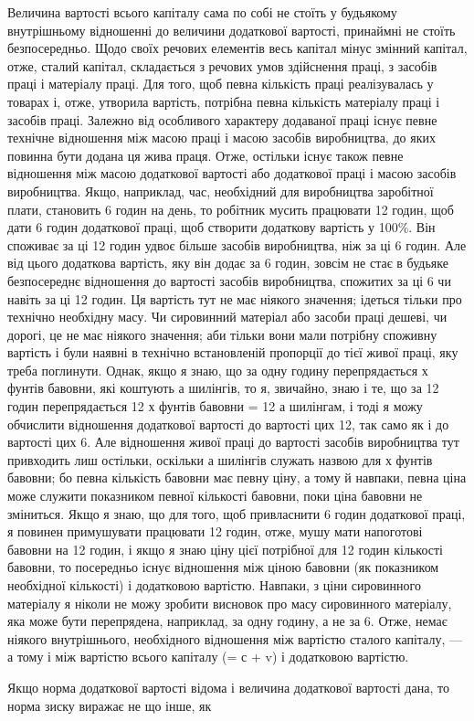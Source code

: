 Величина вартості всього капіталу сама по собі не стоїть
у будьякому внутрішньому відношенні до величини додаткової
вартості, принаймні не стоїть безпосередньо. Щодо своїх речових
елементів весь капітал мінус змінний капітал, отже, сталий капітал,
складається з речових умов здійснення праці, з засобів праці
і матеріалу праці. Для того, щоб певна кількість праці реалізувалась
у товарах і, отже, утворила вартість, потрібна певна
кількість матеріалу праці і засобів праці. Залежно від особливого
характеру додаваної праці існує певне технічне відношення
між масою праці і масою засобів виробництва, до яких повинна
бути додана ця жива праця. Отже, остільки існує також певне
відношення між масою додаткової вартості або додаткової праці
і масою засобів виробництва. Якщо, наприклад, час, необхідний
для виробництва заробітної плати, становить 6 годин на день,
то робітник мусить працювати 12 годин, щоб дати 6 годин додаткової
праці, щоб створити додаткову вартість у 100\%. Він
споживає за ці 12 годин удвоє більше засобів виробництва, ніж
за ці 6 годин. Але від цього додаткова вартість, яку він додає
за 6 годин, зовсім не стає в будьяке безпосереднє відношення
до вартості засобів виробництва, спожитих за ці 6 чи навіть
за ці 12 годин. Ця вартість тут не має ніякого значення; ідеться
тільки про технічно необхідну масу. Чи сировинний матеріал або
засоби праці дешеві, чи дорогі, це не має ніякого значення;
аби тільки вони мали потрібну споживну вартість і були наявні
в технічно встановленій пропорції до тієї живої праці, яку треба
поглинути. Однак, якщо я знаю, що за одну годину перепрядається
х фунтів бавовни, які коштують а шилінгів, то я, звичайно,
знаю і те, що за 12 годин перепрядається 12 х фунтів
бавовни = 12 а шилінгам, і тоді я можу обчислити відношення
додаткової вартості до вартості цих 12, так само як і до вартості
цих 6. Але відношення живої праці до вартості засобів
виробництва тут привходить лиш остільки, оскільки а шилінгів
служать назвою для х фунтів бавовни; бо певна кількість бавовни
має певну ціну, а тому й навпаки, певна ціна може служити
показником певної кількості бавовни, поки ціна бавовни
не зміниться. Якщо я знаю, що для того, щоб привласнити 6 годин
додаткової праці, я повинен примушувати працювати 12 годин,
отже, мушу мати напоготові бавовни на 12 годин, і якщо я знаю
ціну цієї потрібної для 12 годин кількості бавовни, то посередньо
існує відношення між ціною бавовни (як показником необхідної
кількості) і додатковою вартістю. Навпаки, з ціни сировинного
матеріалу я ніколи не можу зробити висновок про масу сировинного
матеріалу, яка може бути перепрядена, наприклад, за
одну годину, а не за 6. Отже, немає ніякого внутрішнього, необхідного
відношення між вартістю сталого капіталу, — а тому
і між вартістю всього капіталу (= с + v) і додатковою вартістю.

Якщо норма додаткової вартості відома і величина додаткової
вартості дана, то норма зиску виражає не що інше, як
